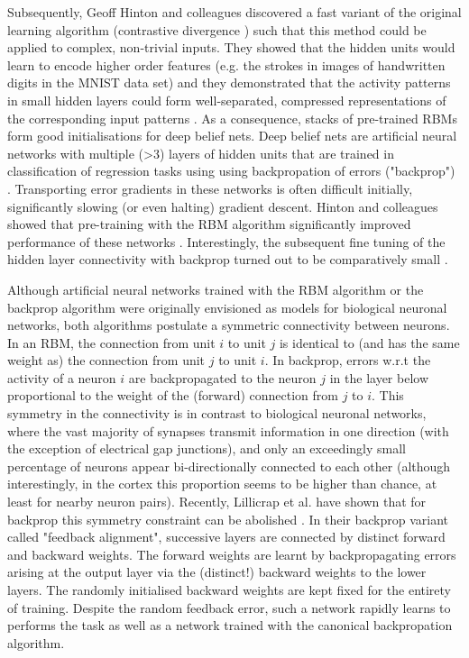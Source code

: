 \documentclass[11pt]{article}
\begin{document}
Subsequently, Geoff Hinton and colleagues discovered a fast variant of
the original learning algorithm (contrastive divergence
\cite{Hinton2002,Carreira-Perpinan2005}) such that this method could be
applied to complex, non-trivial inputs. They showed that the hidden
units would learn to encode higher order features (e.g. the strokes in
images of handwritten digits in the MNIST data set) and they
demonstrated that the activity patterns in small hidden layers could
form well-separated, compressed representations of the corresponding
input patterns \cite{Hinton2006b}. As a consequence, stacks of
pre-trained RBMs form good initialisations for deep belief nets. Deep
belief nets are artificial neural networks with multiple
(\textgreater 3) layers of hidden units that are trained in
classification of regression tasks using using backpropation of errors
("backprop") \cite{Rumelhart1986}. Transporting error gradients in these
networks is often difficult initially, significantly slowing (or even
halting) gradient descent. Hinton and colleagues showed that
pre-training with the RBM algorithm significantly improved performance
of these networks \cite{Hinton2006a,Hinton2006b}. Interestingly, the
subsequent fine tuning of the hidden layer connectivity with backprop
turned out to be comparatively small \cite{Erhan2010}.

Although artificial neural networks trained with the RBM algorithm or
the backprop algorithm were originally envisioned as models for
biological neuronal networks, both algorithms postulate a symmetric
connectivity between neurons. In an RBM, the connection from unit $i$
to unit $j$ is identical to (and has the same weight as) the
connection from unit $j$ to unit $i$. In backprop, errors w.r.t the
activity of a neuron $i$ are backpropagated to the neuron $j$ in the
layer below proportional to the weight of the (forward) connection
from $j$ to $i$. %
This symmetry in the connectivity is in contrast to biological
neuronal networks, where the vast majority of synapses transmit
information in one direction (with the exception of electrical gap
junctions), and only an exceedingly small percentage of neurons appear
bi-directionally connected to each other (although interestingly, in
the cortex this proportion seems to be higher than chance, at least
for nearby neuron pairs). %
Recently, Lillicrap et al. have shown that for backprop this symmetry
constraint can be abolished \cite{Lillicrap2014}. In their backprop
variant called "feedback alignment", successive layers are connected
by distinct forward and backward weights. The forward weights are
learnt by backpropagating errors arising at the output layer via the
(distinct!) backward weights to the lower layers. The randomly
initialised backward weights are kept fixed for the entirety of
training. Despite the random feedback error, such a network rapidly
learns to performs the task as well as a network trained with the
canonical backpropation algorithm.
\end{document}
